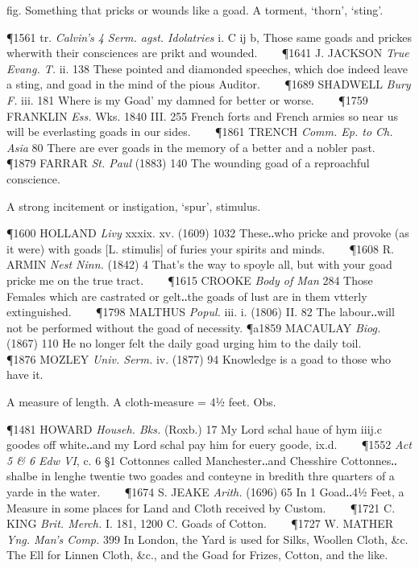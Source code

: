 \begin{description}[wide, labelwidth=!, labelindent=0pt]
\begin{myenumerate}
 fig. Something that pricks or wounds like a goad.  A torment, ‘thorn’, ‘sting’.

\P 1561 tr.  \textit{Calvin's 4 Serm. agst. Idolatries} i. C ij b, Those same goads and prickes wherwith their consciences are prikt and wounded.    
\P 1641 J. JACKSON  \textit{True Evang. T.} ii. 138 These pointed and diamonded speeches, which doe indeed leave a sting, and goad in the mind of the pious Auditor.    
\P 1689 SHADWELL  \textit{Bury F.} iii. 181 Where is my Goad' my damned for better or worse.    
\P 1759 FRANKLIN \textit{Ess.} Wks. 1840 III.  255 French forts and French armies so near us will be everlasting goads in our sides.    
\P 1861 TRENCH  \textit{Comm. Ep. to Ch. Asia} 80 There are ever goads in the memory of a better and a nobler past.    
\P 1879 FARRAR  \textit{St. Paul} (1883) 140 The wounding goad of a reproachful conscience.

 A strong incitement or instigation, ‘spur’, stimulus.

\P 1600 HOLLAND  \textit{Livy} xxxix. xv. (1609) 1032 These‥who  pricke and provoke (as it were) with goads [L. stimulis] of furies your spirits and minds.    
\P 1608 R. ARMIN  \textit{Nest Ninn.} (1842) 4 That's the way to spoyle all, but with your goad pricke me on the true tract.    
\P 1615 CROOKE  \textit{Body of Man} 284 Those Females which are castrated or gelt‥the goads of lust are in them vtterly extinguished.    
\P 1798 MALTHUS  \textit{Popul.} iii. i. (1806) II. 82 The labour‥will not be performed without the goad of necessity.
\P a1859 MACAULAY  \textit{Biog.} (1867) 110 He no longer felt the daily goad urging him to the daily toil.    
\P 1876 MOZLEY  \textit{Univ. Serm.} iv. (1877) 94 Knowledge is a goad to those who have it.

 A measure of length.  A cloth-measure = 4½ feet. Obs.

\P 1481 HOWARD  \textit{Househ. Bks.} (Roxb.) 17 My Lord schal haue of hym iiij.c goodes off white‥and my Lord schal pay him for euery goode, ix.d.    
\P 1552  \textit{Act 5 \& 6 Edw VI}, c. 6 §1 Cottonnes called Manchester‥and Chesshire Cottonnes‥shalbe in lenghe twentie two goades and conteyne in bredith thre quarters of a yarde in the water.    
\P 1674 S. JEAKE  \textit{Arith.} (1696) 65 In 1 Goad‥4½ Feet, a Measure in some places for Land and Cloth received by Custom.    
\P 1721 C. KING  \textit{Brit. Merch.} I. 181, 1200 C. Goads  of Cotton.    
\P 1727 W. MATHER  \textit{Yng. Man's Comp.} 399 In London, the Yard is used for Silks, Woollen Cloth, \&c. The Ell for Linnen Cloth, \&c., and the Goad for Frizes, Cotton, and the like.


\end{myenumerate}
\end{description}
